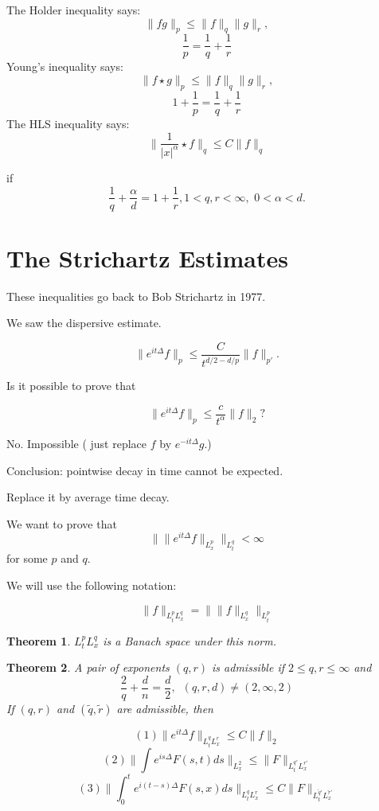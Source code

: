 \documentclass[11pt]{amsart}
\theoremstyle{plain}
\numberwithin{equation}{section}
\newtheorem{thm}{Theorem}[section]
\theoremstyle{remark}
\begin{document}
The Holder inequality says: $$\|fg \|_p \leq \| f\|_q \|g \|_{r},$$ $$\frac{1}{p} = \frac{1}{q}+\frac{1}{r}$$
Young's inequality says: $$\|f\star g \|_p \leq \| f\|_q \|g \|_{r},$$ $$1+\frac{1}{p} = \frac{1}{q}+\frac{1}{r}$$
The HLS inequality says:  $$\|\frac{1}{|x|^\alpha}\star f \|_q \leq C \|f\|_{q}$$

if $$\frac{1}{q} + \frac{\alpha}{d}= 1+ \frac{1}{r}, 1<q,r<\infty, \, \, 0<\alpha<d.$$

\section{The Strichartz Estimates}

These inequalities go back to Bob Strichartz in 1977. 

We saw the dispersive estimate. 

$$\| e^{it\Delta} f \|_p \leq \frac{C}{t^{d/2-d/p}} \| f\|_{p'}.$$

Is it possible to prove that 

$$\| e^{it\Delta} f \|_p \leq \frac{c}{t^\alpha} \|f\|_2? $$

No. Impossible ( just replace $f$ by $e^{-it\Delta}g$.)

Conclusion: pointwise decay in time cannot be expected. 

Replace it by average time decay. 

We want to prove that $$\big \| \| e^{it\Delta} f \|_{L^p_x} \big \|_{L^q_t} <\infty$$ for some $p$ and $q.$

We will use the following notation:

$$\|f\|_{L^p_t L^q_x} =  \big \| \| f \|_{L^q_x} \big \|_{L^p_t} $$

\begin{thm}
$L^p_t L^q_x$ is a Banach space under this norm. 
\end{thm}


\begin{thm}
A pair of exponents $(q,r)$ is admissible if $2\leq q,r\leq \infty $ and $$\frac{2}{q}+\frac{d}{n}=\frac{d}{2}, \, \, \, (q,r,d) \not = (2,\infty, 2)$$
If $(q,r)$ and $(\tilde{q},\tilde{r})$ are admissible, then 

$$(1) \| e^{it\Delta}f \|_{L^q_t L^r_x} \leq C\|f\|_2$$
$$(2) \| \int e^{is\Delta} F(s,t)ds \|_{L^2_x} \leq \| F\|_{L^{q'}_t L^{r'}_x}$$
$$(3) \| \int_{0}^{t} e^{i(t-s)\Delta} F(s,x) ds \|_{L^q_tL^r_x} \leq C \|F \|_{L^{\tilde{q}'}_t L^{\tilde{r}'}_x} $$


 
\end{thm}
\end{document}
